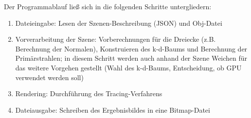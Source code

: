 Der Programmablauf ließ sich in die folgenden Schritte untergliedern:
\begin{enumerate}
\item Dateieingabe: Lesen der Szenen-Beschreibung (JSON) und Obj-Datei
\item Vorverarbeitung der Szene: Vorberechnungen für die Dreiecke (z.B. Berechnung der Normalen), Konstruieren des k-d-Baums und Berechnung der Primärstrahlen; in diesem Schritt werden auch anhand der Szene Weichen für das weitere Vorgehen gestellt (Wahl des k-d-Baums, Entscheidung, ob GPU verwendet werden soll)
\item Rendering: Durchführung des Tracing-Verfahrens
\item Dateiausgabe: Schreiben des Ergebnisbildes in eine Bitmap-Datei
\end{enumerate}

